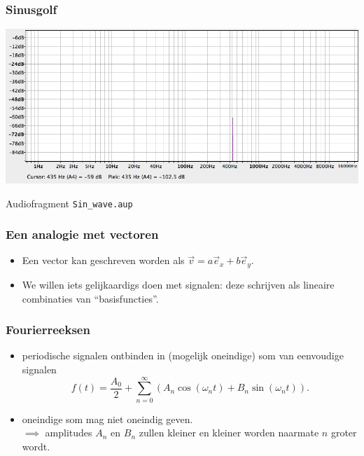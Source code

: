 \documentclass[compress, darktitle, framenumber, totalframenumber]{beamer}
\newcommand{\brac}[1]{\left( #1 \right)} %
\begin{document}
\begin{frame}
\frametitle{Sinusgolf}
\includegraphics[width=\textwidth]{images/Sin_wave.png}
\begin{block}{Audiofragment}
\texttt{Sin\_wave.aup}
\end{block}
\end{frame}

\begin{frame}[fragile]
\frametitle{Een analogie met vectoren}
\begin{itemize}
\item Een vector kan geschreven worden als $\vec{v}=a\vec{e}_x+b\vec{e}_y.$
\end{itemize}
\begin{center}
\end{center}
\begin{itemize}
\item We willen iets gelijkaardigs doen met signalen: deze schrijven als lineaire combinaties van ``basisfuncties''.
\end{itemize}
\end{frame}

\begin{frame}
\frametitle{Fourierreeksen}
\begin{itemize}
\item periodische signalen ontbinden in (mogelijk oneindige) som van eenvoudige signalen 
\begin{equation*}
f(t)=\frac{A_0}{2}+\sum_{n=0}^{\infty}\brac{A_n \cos(\omega_n t)+B_n\sin(\omega_n t)}. 
\end{equation*}
\item oneindige som mag niet oneindig geven. \\ \noindent 
$\implies$ amplitudes $A_n$ en $B_n$ zullen kleiner en kleiner worden naarmate $n$ groter wordt. 
\end{itemize}
\end{frame}
\end{document}
